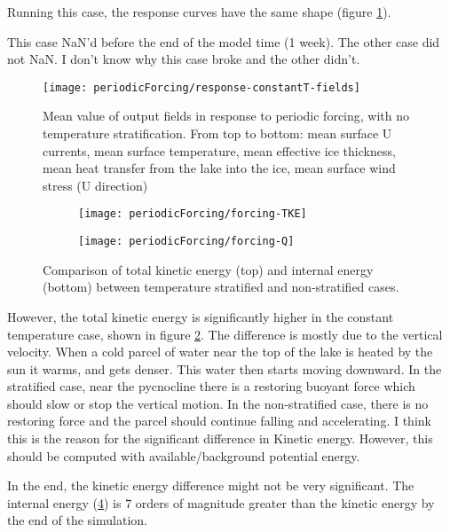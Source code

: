 \documentclass[11pt]{article}
\begin{document}
Running this case, the response curves have the same shape (figure \ref{fig:periodicForcingResponseConstantT}).

This case NaN'd before the end of the model time (1 week). The other case did not NaN. I don't know why this case broke and the other didn't.

\begin{figure}[h!]
\texttt{[image: periodicForcing/response-constantT-fields]}
\caption{Mean value of output fields in response to periodic forcing, with no temperature stratification. From top to bottom: mean surface U currents, mean surface temperature, mean effective ice thickness, mean heat transfer from the lake into the ice, mean surface wind stress (U direction)}
\label{fig:periodicForcingResponseConstantT}
\end{figure}

\begin{figure}[h!]
\centering
\begin{subfigure}{0.48\linewidth}
\texttt{[image: periodicForcing/forcing-TKE]}
\caption{}
\label{fig:periodicForcingTKE}
\end{subfigure}
\begin{subfigure}{0.48\linewidth}
\texttt{[image: periodicForcing/forcing-Q]}
\caption{}
\label{fig:periodicForcingQ}
\end{subfigure}
\caption{Comparison of total kinetic energy (top) and internal energy (bottom) between temperature stratified and non-stratified cases.}
\end{figure}

However, the total kinetic energy is significantly higher in the constant temperature case, shown in figure \ref{fig:periodicForcingTKE}. The difference is mostly due to the vertical velocity. When a cold parcel of water near the top of the lake is heated by the sun it warms, and gets denser. This water then starts moving downward. In the stratified case, near the pycnocline there is a restoring buoyant force which should slow or stop the vertical motion. In the non-stratified case, there is no restoring force and the parcel should continue falling and accelerating. I think this is the reason for the significant difference in Kinetic energy. However, this should be computed with available/background potential energy.

In the end, the kinetic energy difference might not be very significant. The internal energy (\ref{fig:periodicForcingQ}) is 7 orders of magnitude greater than the kinetic energy by the end of the simulation.
\end{document}
